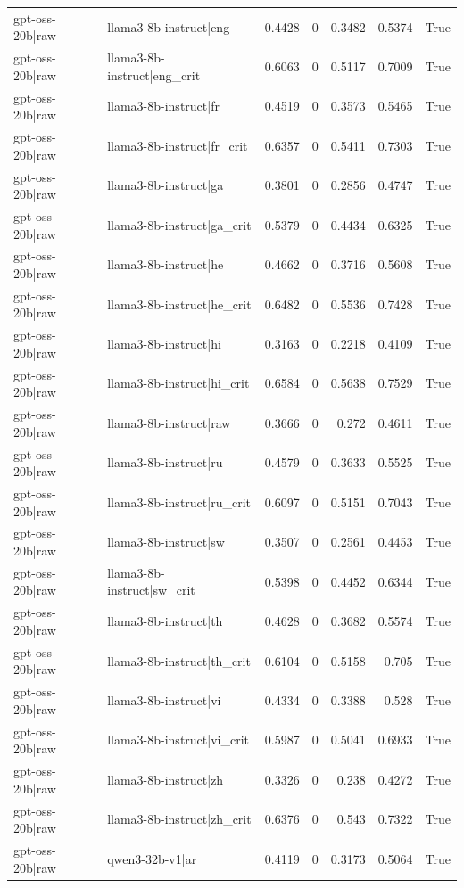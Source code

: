 \begin{table}
\begin{tabular}{l l r r r r l}
gpt-oss-20b|raw & llama3-8b-instruct|eng & 0.4428 & 0 & 0.3482 & 0.5374 & True \\
gpt-oss-20b|raw & llama3-8b-instruct|eng_crit & 0.6063 & 0 & 0.5117 & 0.7009 & True \\
gpt-oss-20b|raw & llama3-8b-instruct|fr & 0.4519 & 0 & 0.3573 & 0.5465 & True \\
gpt-oss-20b|raw & llama3-8b-instruct|fr_crit & 0.6357 & 0 & 0.5411 & 0.7303 & True \\
gpt-oss-20b|raw & llama3-8b-instruct|ga & 0.3801 & 0 & 0.2856 & 0.4747 & True \\
gpt-oss-20b|raw & llama3-8b-instruct|ga_crit & 0.5379 & 0 & 0.4434 & 0.6325 & True \\
gpt-oss-20b|raw & llama3-8b-instruct|he & 0.4662 & 0 & 0.3716 & 0.5608 & True \\
gpt-oss-20b|raw & llama3-8b-instruct|he_crit & 0.6482 & 0 & 0.5536 & 0.7428 & True \\
gpt-oss-20b|raw & llama3-8b-instruct|hi & 0.3163 & 0 & 0.2218 & 0.4109 & True \\
gpt-oss-20b|raw & llama3-8b-instruct|hi_crit & 0.6584 & 0 & 0.5638 & 0.7529 & True \\
gpt-oss-20b|raw & llama3-8b-instruct|raw & 0.3666 & 0 & 0.272 & 0.4611 & True \\
gpt-oss-20b|raw & llama3-8b-instruct|ru & 0.4579 & 0 & 0.3633 & 0.5525 & True \\
gpt-oss-20b|raw & llama3-8b-instruct|ru_crit & 0.6097 & 0 & 0.5151 & 0.7043 & True \\
gpt-oss-20b|raw & llama3-8b-instruct|sw & 0.3507 & 0 & 0.2561 & 0.4453 & True \\
gpt-oss-20b|raw & llama3-8b-instruct|sw_crit & 0.5398 & 0 & 0.4452 & 0.6344 & True \\
gpt-oss-20b|raw & llama3-8b-instruct|th & 0.4628 & 0 & 0.3682 & 0.5574 & True \\
gpt-oss-20b|raw & llama3-8b-instruct|th_crit & 0.6104 & 0 & 0.5158 & 0.705 & True \\
gpt-oss-20b|raw & llama3-8b-instruct|vi & 0.4334 & 0 & 0.3388 & 0.528 & True \\
gpt-oss-20b|raw & llama3-8b-instruct|vi_crit & 0.5987 & 0 & 0.5041 & 0.6933 & True \\
gpt-oss-20b|raw & llama3-8b-instruct|zh & 0.3326 & 0 & 0.238 & 0.4272 & True \\
gpt-oss-20b|raw & llama3-8b-instruct|zh_crit & 0.6376 & 0 & 0.543 & 0.7322 & True \\
gpt-oss-20b|raw & qwen3-32b-v1|ar & 0.4119 & 0 & 0.3173 & 0.5064 & True \\

\end{tabular}
\end{table}

